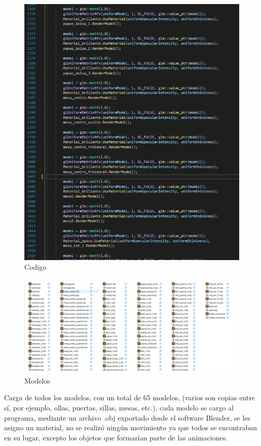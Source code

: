 \documentclass[letter,12pt]{article}
\begin{document}
\begin{figure}[H]
		\includegraphics[scale=0.4]{img/img4}
		\centering
		\caption{Codigo}
	\end{figure}
\begin{figure}[H]
		\includegraphics[scale=0.5]{img/img5}
		\centering
		\caption{Modelos}
	\end{figure}

Carga de todos los modelos, con un total de 65 modelos, (varios son copias entre sí, por ejemplo, ollas, puertas, sillas, mesas, etc.), cada modelo se cargo al programa, mediante un archivo .obj exportado desde el software Blender, se les asigno un material, no se realizó ningún movimiento ya que todos se encontraban en su lugar, excepto los objetos que formarían parte de las animaciones.
\end{document}
